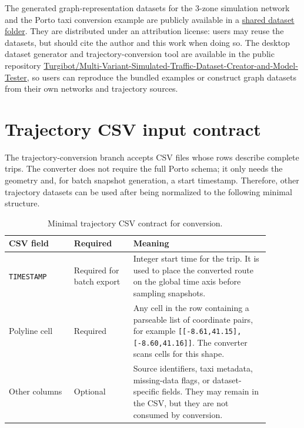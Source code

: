The generated graph-representation datasets for the 3-zone simulation network and the Porto taxi conversion example are publicly available in a \href{https://drive.google.com/drive/folders/1baEONbv8WyDVanF_qvLCq1UJ4oT5N7LE?usp=sharing}{shared dataset folder}. They are distributed under an attribution license: users may reuse the datasets, but should cite the author and this work when doing so. The desktop dataset generator and trajectory-conversion tool are available in the public repository \href{https://github.com/Turgibot/Multi-Variant-Simulated-Traffic-Dataset-Creator-and-Model-Tester}{Turgibot/Multi-Variant-Simulated-Traffic-Dataset-Creator-and-Model-Tester}, so users can reproduce the bundled examples or construct graph datasets from their own networks and trajectory sources.

\section{Trajectory CSV input contract}\label{sec:dataset:csv-contract}
The trajectory-conversion branch accepts CSV files whose rows describe complete trips. The converter does not require the full Porto schema; it only needs the geometry and, for batch snapshot generation, a start timestamp. Therefore, other trajectory datasets can be used after being normalized to the following minimal structure.

\begin{table}[!htbp]
\centering
\scriptsize
\begin{tabular}{p{0.22\linewidth}p{0.20\linewidth}p{0.46\linewidth}}
\toprule
\textbf{CSV field} & \textbf{Required} & \textbf{Meaning} \\
\midrule
\texttt{TIMESTAMP} & Required for batch export & Integer start time for the trip. It is used to place the converted route on the global time axis before sampling snapshots. \\
Polyline cell & Required & Any cell in the row containing a parseable list of coordinate pairs, for example \texttt{[[-8.61,41.15],[-8.60,41.16]]}. The converter scans cells for this shape. \\
Other columns & Optional & Source identifiers, taxi metadata, missing-data flags, or dataset-specific fields. They may remain in the CSV, but they are not consumed by conversion. \\
\bottomrule
\end{tabular}
\caption{Minimal trajectory CSV contract for conversion.}
\label{tab:trajectory_csv_contract}
\end{table}

